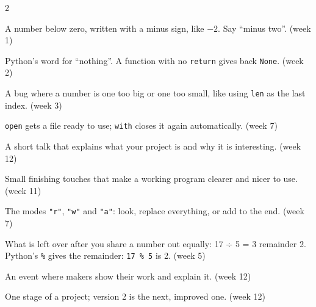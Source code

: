 \documentclass[level=2]{kidscode}
\begin{document}
\begin{multicols}{2}
\begin{description}[leftmargin=0pt,itemsep=3pt,font=\bfseries]
\item[negative number] A number below zero, written with a minus sign, like $-2$. Say \enquote{minus two}. {\small\color{kcgray}(week 1)}
\item[None] Python's word for \enquote{nothing}. A function with no \texttt{return} gives back \texttt{None}. {\small\color{kcgray}(week 2)}
\item[off-by-one] A bug where a number is one too big or one too small, like using \texttt{len} as the last index. {\small\color{kcgray}(week 3)}
\item[open / with] \texttt{open} gets a file ready to use; \texttt{with} closes it again automatically. {\small\color{kcgray}(week 7)}
\item[pitch] A short talk that explains what your project is and why it is interesting. {\small\color{kcgray}(week 12)}
\item[polish] Small finishing touches that make a working program clearer and nicer to use. {\small\color{kcgray}(week 11)}
\item[read / write / append] The modes \texttt{"r"}, \texttt{"w"} and \texttt{"a"}: look, replace everything, or add to the end. {\small\color{kcgray}(week 7)}
\item[remainder] What is left over after you share a number out equally: 17 ÷ 5 = 3 remainder 2. Python's \texttt{\%} gives the remainder: \texttt{17 \% 5} is 2. {\small\color{kcgray}(week 5)}
\item[showcase] An event where makers show their work and explain it. {\small\color{kcgray}(week 12)}
\item[version] One stage of a project; version 2 is the next, improved one. {\small\color{kcgray}(week 12)}
\end{description}
\end{multicols}
\end{document}
